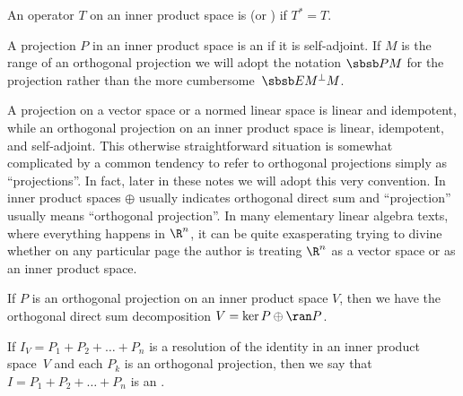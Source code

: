 \begin{defn} An operator $T$ on an inner product space is
 (or
) if $T^* = T$.
\end{defn}

\begin{defn}\label{000164} A projection $P$ in an inner product space is an
 if it is self-adjoint.  If $M$ is the range of an orthogonal
projection we will adopt the notation
$\sbsb PM$ for the projection rather than the more cumbersome~$\sbsb E{M^\perp M}$.
\end{defn}

\begin{cau} A projection on a vector space or a normed linear space is linear and idempotent,
while an orthogonal projection on an inner product space is linear, idempotent, and
self-adjoint.  This otherwise straightforward situation is somewhat complicated by a
common tendency to refer to orthogonal projections simply as ``projections''.  In fact,
later in these notes we will adopt this very convention.  In inner product spaces
$\oplus$ usually indicates orthogonal direct sum and ``projection'' usually means
``orthogonal projection''. In many elementary linear algebra texts, where everything
happens in $\R^n$, it can be quite exasperating trying to divine whether on any
particular page the author is treating $\R^n$ as a vector space or as an inner product
space.
\end{cau}

\begin{prop} If $P$ is an orthogonal projection on an inner product space $V$, then we have
the orthogonal direct sum decomposition $V = \ker P \oplus \ran P$.
\end{prop}

\begin{defn} If $I_V = P_1 + P_2 + \dots + P_n$ is a resolution of the identity in an
inner product space~$V$ and each $P_k$ is an orthogonal projection, then we say that $I =
P_1 + P_2 + \dots + P_n$ is an
.
\end{defn}

